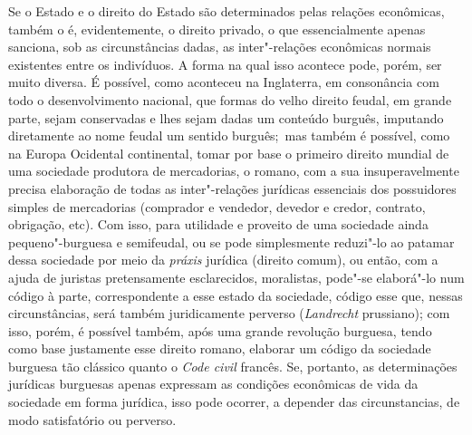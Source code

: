 Se o Estado e o direito do Estado são determinados pelas relações
econômicas, também o é, evidentemente, o direito privado, o que
essencialmente apenas sanciona, sob as circunstâncias dadas, as
inter"-relações econômicas normais existentes entre os indivíduos. A
forma na qual isso acontece pode, porém, ser muito diversa. É possível,
como aconteceu na Inglaterra, em consonância com todo o desenvolvimento
nacional, que formas do velho direito feudal, em grande parte, sejam
conservadas e lhes sejam dadas um conteúdo burguês, imputando
diretamente ao nome feudal um sentido burguês;\est\ mas também é possível,
como na Europa Ocidental continental, tomar por base o primeiro direito
mundial de uma sociedade produtora de mercadorias, o romano, com a sua
insuperavelmente precisa elaboração de todas as inter"-relações jurídicas
essenciais dos possuidores simples de mercadorias (comprador e vendedor,
devedor e credor, contrato, obrigação, etc). Com isso, para utilidade e
proveito de uma sociedade ainda pequeno"-burguesa e semifeudal, ou se
pode simplesmente reduzi"-lo ao patamar dessa sociedade por meio da
\emph{práxis} jurídica (direito comum), ou então, com a ajuda de
juristas pretensamente esclarecidos, moralistas, pode"-se elaborá"-lo num
código à parte, correspondente a esse estado da sociedade, código esse
que, nessas circunstâncias, será também juridicamente perverso
(\emph{Landrecht} prussiano); com isso,
porém, é possível também, após uma grande revolução burguesa, tendo como
base justamente esse direito romano, elaborar um código da sociedade
burguesa tão clássico quanto o \emph{Code
civil} francês. Se, portanto, as
determinações jurídicas burguesas apenas expressam as condições
econômicas de vida da sociedade em forma jurídica, isso pode ocorrer, a
depender das circunstancias, de modo satisfatório  ou
perverso.

